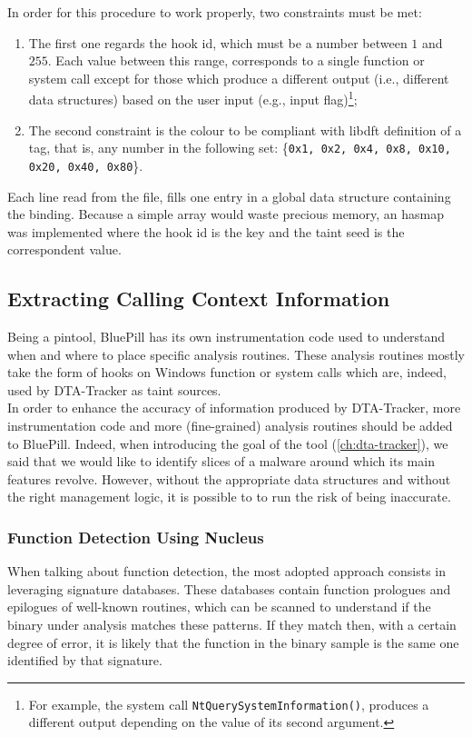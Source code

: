 \documentclass[LaM,binding=0.6cm]{sapthesis}
\begin{document}
\clearpage
\noindent
In order for this procedure to work properly, two constraints must be met:
\begin{enumerate}
\item The first one regards the hook id, which must be a number between $1$ and $255$. Each value between this range, corresponds to a single function or system call except for those which produce a different output (i.e., different data structures) based on the user input (e.g., input flag)\footnote{For example, the system call \texttt{NtQuerySystemInformation()}, produces a different output depending on the value of its second argument.};
\item The second constraint is the colour to be compliant with libdft definition of a tag, that is, any number in the following set: \{\texttt{0x1, 0x2, 0x4, 0x8, 0x10, 0x20, 0x40, 0x80}\}.
\end{enumerate}
Each line read from the file, fills one entry in a global data structure containing the binding. Because a simple array would waste precious memory, an hasmap was implemented where the hook id is the key and the taint seed is the correspondent value.

\subsection{Extracting Calling Context Information}
Being a pintool, BluePill has its own instrumentation code used to understand when and where to place specific analysis routines. These analysis routines mostly take the form of hooks on Windows function or system calls which are, indeed, used by {\sf DTA-Tracker} as taint sources.\\

In order to enhance the accuracy of information produced by {\sf DTA-Tracker}, more instrumentation code and more (fine-grained) analysis routines should be added to BluePill. Indeed, when introducing the goal of the tool (\autoref{ch:dta-tracker}), we said that we would like to identify slices of a malware around which its main features revolve. However, without the appropriate data structures and without the right management logic, it is possible to to run the risk of being inaccurate.

\subsubsection{Function Detection Using Nucleus}
When talking about function detection, the most adopted approach consists in leveraging signature databases. These databases contain function prologues and epilogues of well-known routines, which can be scanned to understand if the binary under analysis matches these patterns. If they match then, with a certain degree of error, it is likely that the function in the binary sample is the same one identified by that signature.
\end{document}
